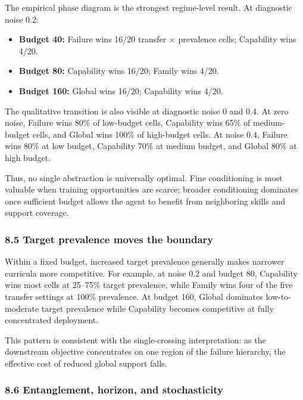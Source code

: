 \documentclass[
]{article}
\providecommand{\tightlist}{%
  \setlength{\itemsep}{0pt}\setlength{\parskip}{0pt}}
\begin{document}
The empirical phase diagram is the strongest regime-level result. At
diagnostic noise 0.2:

\begin{itemize}
\tightlist
\item
  \textbf{Budget 40:} Failure wins 16/20 transfer × prevalence cells;
  Capability wins 4/20.
\item
  \textbf{Budget 80:} Capability wins 16/20; Family wins 4/20.
\item
  \textbf{Budget 160:} Global wins 16/20; Capability wins 4/20.
\end{itemize}

The qualitative transition is also visible at diagnostic noise 0 and
0.4. At zero noise, Failure wins 80\% of low-budget cells, Capability
wins 65\% of medium-budget cells, and Global wins 100\% of high-budget
cells. At noise 0.4, Failure wins 80\% at low budget, Capability 70\% at
medium budget, and Global 80\% at high budget.

Thus, no single abstraction is universally optimal. Fine conditioning is
most valuable when training opportunities are scarce; broader
conditioning dominates once sufficient budget allows the agent to
benefit from neighboring skills and support coverage.

\subsubsection{8.5 Target prevalence moves the
boundary}\label{target-prevalence-moves-the-boundary}

Within a fixed budget, increased target prevalence generally makes
narrower curricula more competitive. For example, at noise 0.2 and
budget 80, Capability wins most cells at 25--75\% target prevalence,
while Family wins four of the five transfer settings at 100\%
prevalence. At budget 160, Global dominates low-to-moderate target
prevalence while Capability becomes competitive at fully concentrated
deployment.

This pattern is consistent with the single-crossing interpretation: as
the downstream objective concentrates on one region of the failure
hierarchy, the effective cost of reduced global support falls.

\subsubsection{8.6 Entanglement, horizon, and
stochasticity}\label{entanglement-horizon-and-stochasticity}
\end{document}
